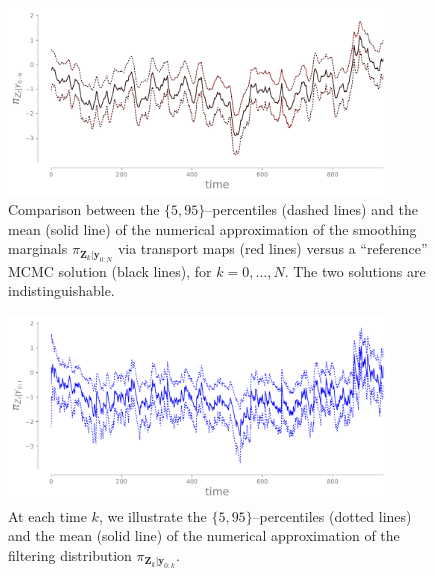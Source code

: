 \documentclass[twoside,11pt]{article}
\newcommand{\yb}{\boldsymbol{y}}
\newcommand{\Zb}{\boldsymbol{Z}}
\begin{document}
\vspace{60pt}
%
\begin{figure}[H] %
  \begin{center}
        \includegraphics[width=0.90\textwidth, bb=25bp 0bp 650bp 290bp, clip]{smoothing-marginals-vs-unbiased-timesteps.pdf}   
    \caption{    
%
%
%
%
%
%
%
%
      Comparison between the $\{5,95\}$--percentiles (dashed lines) and the mean (solid line)
      of the numerical approximation of the
      smoothing marginals $\pi_{ \Zb_{k} \vert \yb_{0:N}}$ via
      transport maps (red lines) versus a ``reference'' MCMC solution 
      (black lines), %
      for $k=0,\ldots,N$. The two solutions are indistinguishable.}
    \label{fig:stoc-vol:smoothing-vs-unbiased}
  \end{center}
\end{figure}


\begin{figure}[H] %
  \begin{center}
        \includegraphics[width=0.90\textwidth, bb=25bp 0bp 650bp 290bp, clip]{filtering-marginals-timesteps.pdf}   
    \caption{At each time $k$, we illustrate the
      $\{5,95\}$--percentiles (dotted lines) and the mean (solid line) of the
      numerical approximation of the filtering distribution 
      $\pi_{ \Zb_k \vert \yb_{0:k}}$.
       }
    \label{fig:stoc-vol:filtering} 
  \end{center}
\end{figure}
\end{document}
